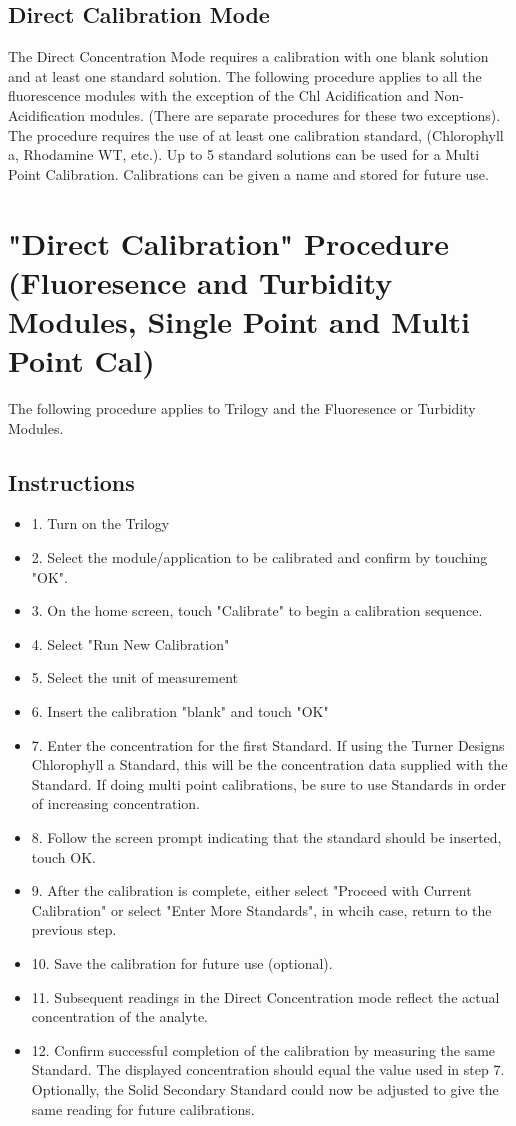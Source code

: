 \documentclass[12pt]{../SOP3_beta}
\begin{document}
\subsection{Direct Calibration Mode}
\NP The Direct Concentration Mode requires a calibration with one blank solution and at least one standard solution. The following procedure applies to all the fluorescence modules with the exception of the Chl Acidification and Non-Acidification modules. (There are separate procedures for these two exceptions). The procedure requires the use of at least one calibration standard, (Chlorophyll a, Rhodamine WT, etc.). Up to 5 standard solutions can be used for a Multi Point Calibration. Calibrations can be given a name and stored for future use. 

\section{"Direct Calibration" Procedure (Fluoresence and Turbidity Modules, Single Point and Multi Point Cal)}
\NP The following procedure applies to Trilogy and the Fluoresence or Turbidity Modules.
\subsection{Instructions}
\begin{itemize}
  \item 1. Turn on the Trilogy
  \item 2. Select the module/application to be calibrated and confirm by touching "OK".
  \item 3. On the home screen, touch "Calibrate" to begin a calibration sequence.
  \item 4. Select "Run New Calibration"
  \item 5. Select the unit of measurement 
  \item 6. Insert the calibration "blank" and touch "OK"
  \item 7. Enter the concentration for the first Standard. If using the Turner Designs Chlorophyll a Standard, this will be the concentration data supplied with the Standard. If doing multi point calibrations, be sure to use Standards in order of increasing concentration.
  \item 8. Follow the screen prompt indicating that the standard should be inserted, touch OK.
  \item 9. After the calibration is complete, either select "Proceed with Current Calibration" or select "Enter More Standards", in whcih case, return to the previous step.
  \item 10. Save the calibration for future use (optional).
  \item 11. Subsequent readings in the Direct Concentration mode reflect the actual concentration of the analyte. 
  \item 12. Confirm successful completion of the calibration by measuring the same Standard. The displayed concentration should equal the value used in step 7. Optionally, the Solid Secondary Standard could now be adjusted to give the same reading for future calibrations.
\end{itemize}
\end{document}
